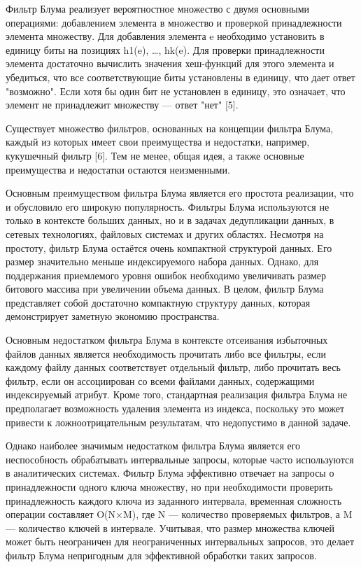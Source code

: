 Фильтр Блума реализует вероятностное множество с двумя основными операциями: добавлением элемента в множество и проверкой принадлежности элемента множеству. Для добавления элемента e необходимо установить в единицу биты на позициях h1(e), …, hk(e). Для проверки принадлежности элемента достаточно вычислить значения хеш-функций для этого элемента и убедиться, что все соответствующие биты установлены в единицу, что дает ответ "возможно". Если хотя бы один бит не установлен в единицу, это означает, что элемент не принадлежит множеству — ответ "нет" [5].

Существует множество фильтров, основанных на концепции фильтра Блума, каждый из которых имеет свои преимущества и недостатки, например, кукушечный фильтр [6]. Тем не менее, общая идея, а также основные преимущества и недостатки остаются неизменными.

Основным преимуществом фильтра Блума является его простота реализации, что и обусловило его широкую популярность. Фильтры Блума используются не только в контексте больших данных, но и в задачах дедупликации данных, в сетевых технологиях, файловых системах и других областях. Несмотря на простоту, фильтр Блума остаётся очень компактной структурой данных. Его размер значительно меньше индексируемого набора данных. Однако, для поддержания приемлемого уровня ошибок необходимо увеличивать размер битового массива при увеличении объема данных. В целом, фильтр Блума представляет собой достаточно компактную структуру данных, которая демонстрирует заметную экономию пространства.

Основным недостатком фильтра Блума в контексте отсеивания избыточных файлов данных является необходимость прочитать либо все фильтры, если каждому файлу данных соответствует отдельный фильтр, либо прочитать весь фильтр, если он ассоциирован со всеми файлами данных, содержащими индексируемый атрибут. Кроме того, стандартная реализация фильтра Блума не предполагает возможность удаления элемента из индекса, поскольку это может привести к ложноотрицательным результатам, что недопустимо в данной задаче.

Однако наиболее значимым недостатком фильтра Блума является его неспособность обрабатывать интервальные запросы, которые часто используются в аналитических системах. Фильтр Блума эффективно отвечает на запросы о принадлежности одного ключа множеству, но при необходимости проверить принадлежность каждого ключа из заданного интервала, временная сложность операции составляет O(N×M), где N — количество проверяемых фильтров, а M — количество ключей в интервале. Учитывая, что размер множества ключей может быть неограничен для неограниченных интервальных запросов, это делает фильтр Блума непригодным для эффективной обработки таких запросов.

